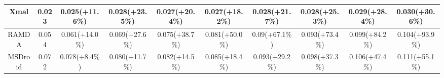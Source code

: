 \begin{table}[t]
\begin{adjustbox}{width=\textwidth}
\begin{tabular}{@{}c|c|c|c|c|c|c|c|c|c@{}}
            Xmal              & 0.023               & 0.025(+11.6\%)      & 0.028(+23.5\%)      & 0.027(+20.4\%)      & 0.027(+18.2\%)       & 0.028(+21.7\%)       & 0.028(+25.3\%)       & 0.029(+28.4\%)       & 0.030(+30.6\%)       \\ \midrule
            RAMDA             & 0.054               & 0.061(+14.0\%)      & 0.069(+27.6\%)      & 0.075(+38.7\%)      & 0.081(+50.0\%)       & 0.09(+67.1\%)        & 0.093(+73.4\%)       & 0.099(+84.2\%)       & 0.104(+93.9\%)       \\ \midrule
            MSDroid           & 0.072               & 0.078(+8.4\%)       & 0.080(+11.7\%)      & 0.082(+14.5\%)      & 0.085(+18.4\%)       & 0.093(+29.2\%)       & 0.098(+37.3\%)       & 0.106(+47.4\%)       & 0.111(+55.1\%)       \\ \bottomrule
            \end{tabular}
    \end{adjustbox}
    \label{tab:tpr_time_decay}
    \vspace{-0.3cm}  
\end{table}


